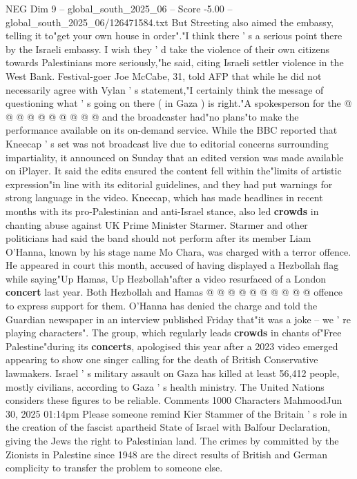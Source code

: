\begin{textsample}{NEG Dim 9 – global\_south\_2025\_06 – Score -5.00 – global\_south\_2025\_06/126471584.txt}
But Streeting also aimed the embassy, telling it to"get your own house in order"."I think there ' s a serious point there by the Israeli embassy.
I wish they ' d take the violence of their own citizens towards Palestinians more seriously,"he said, citing Israeli settler violence in the West Bank.
Festival-goer Joe McCabe, 31, told AFP that while he did not necessarily agree with Vylan ' s statement,"I certainly think the message of questioning what ' s going on there ( in Gaza ) is right."A spokesperson for the @ @ @ @ @ @ @ @ @ @ and the broadcaster had"no plans"to make the performance available on its on-demand service.
While the BBC reported that Kneecap ' s set was not broadcast live due to editorial concerns surrounding impartiality, it announced on Sunday that an edited version was made available on iPlayer.
It said the edits ensured the content fell within the"limits of artistic expression"in line with its editorial guidelines, and they had put warnings for strong language in the video.
Kneecap, which has made headlines in recent months with its pro-Palestinian and anti-Israel stance, also led \textbf{crowds} in chanting abuse against UK Prime Minister Starmer.
Starmer and other politicians had said the band should not perform after its member Liam O'Hanna, known by his stage name Mo Chara, was charged with a terror offence.
He appeared in court this month, accused of having displayed a Hezbollah flag while saying"Up Hamas, Up Hezbollah"after a video resurfaced of a London \textbf{concert} last year.
Both Hezbollah and Hamas @ @ @ @ @ @ @ @ @ @ offence to express support for them.
O'Hanna has denied the charge and told the Guardian newspaper in an interview published Friday that"it was a joke -- we ' re playing characters".
The group, which regularly leads \textbf{crowds} in chants of"Free Palestine"during its \textbf{concerts}, apologised this year after a 2023 video emerged appearing to show one singer calling for the death of British Conservative lawmakers.
Israel ' s military assault on Gaza has killed at least 56,412 people, mostly civilians, according to Gaza ' s health ministry.
The United Nations considers these figures to be reliable.
Comments 1000 Characters MahmoodJun 30, 2025 01:14pm Please someone remind Kier Stammer of the Britain ' s role in the creation of the fascist apartheid State of Israel with Balfour Declaration, giving the Jews the right to Palestinian land.
The crimes by committed by the Zionists in Palestine since 1948 are the direct results of British and German complicity to transfer the problem to someone else.

\end{textsample}
